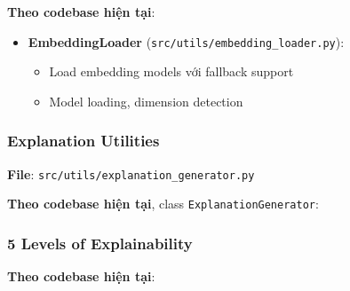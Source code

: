 \textbf{Theo codebase hiện tại}:

\begin{itemize}
    \item \textbf{EmbeddingLoader} (\texttt{src/utils/embedding\_loader.py}):
    \begin{itemize}
        \item Load embedding models với fallback support
        \item Model loading, dimension detection
    \end{itemize}
\end{itemize}

\subsubsection{Explanation Utilities}

\textbf{File}: \texttt{src/utils/explanation\_generator.py}

\textbf{Theo codebase hiện tại}, class \texttt{ExplanationGenerator}:

\subsubsection{5 Levels of Explainability}

\textbf{Theo codebase hiện tại}:

